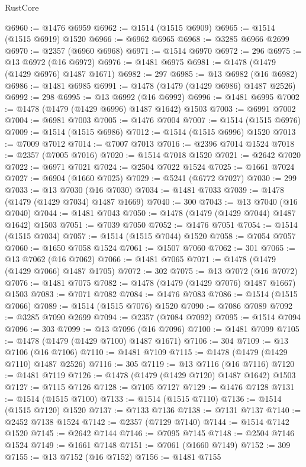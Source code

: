 \begin{lexlean}{RustCore}
\begin{coremodule}
@6960 := @1476 @6959
@6962 := @1514 (@1515 @6909)
@6965 := @1514 (@1515 @6919) @1520
@6966 := @6962 @6965
@6968 := @3285 @6966 @2699
@6970 := @2357 (@6960 @6968)
@6971 := @1514 @6970
@6972 := 296
@6975 := @13 @6972 (@16 @6972)
@6976 := @1481 @6975
@6981 := @1478 (@1479 (@1429 @6976) @1487 @1671)
@6982 := 297
@6985 := @13 @6982 (@16 @6982)
@6986 := @1481 @6985
@6991 := @1478 (@1479 (@1429 @6986) @1487 @2526)
@6992 := 298
@6995 := @13 @6992 (@16 @6992)
@6996 := @1481 @6995
@7002 := @1478 (@1479 (@1429 @6996) @1487 @1642) @1503
@7003 := @6991 @7002
@7004 := @6981 @7003
@7005 := @1476 @7004
@7007 := @1514 (@1515 @6976)
@7009 := @1514 (@1515 @6986)
@7012 := @1514 (@1515 @6996) @1520
@7013 := @7009 @7012
@7014 := @7007 @7013
@7016 := @2396 @7014 @1524
@7018 := @2357 (@7005 @7016)
@7020 := @1514 @7018 @1520
@7021 := @2642 @7020
@7022 := @6971 @7021
@7024 := @2504 @7022 @1524
@7025 := @1661 @7024
@7027 := @6904 (@1660 @7025)
@7029 := @5241 (@6772 @7027)
@7030 := 299
@7033 := @13 @7030 (@16 @7030)
@7034 := @1481 @7033
@7039 := @1478 (@1479 (@1429 @7034) @1487 @1669)
@7040 := 300
@7043 := @13 @7040 (@16 @7040)
@7044 := @1481 @7043
@7050 := @1478 (@1479 (@1429 @7044) @1487 @1642) @1503
@7051 := @7039 @7050
@7052 := @1476 @7051
@7054 := @1514 (@1515 @7034)
@7057 := @1514 (@1515 @7044) @1520
@7058 := @7054 @7057
@7060 := @1650 @7058 @1524
@7061 := @1507 @7060
@7062 := 301
@7065 := @13 @7062 (@16 @7062)
@7066 := @1481 @7065
@7071 := @1478 (@1479 (@1429 @7066) @1487 @1705)
@7072 := 302
@7075 := @13 @7072 (@16 @7072)
@7076 := @1481 @7075
@7082 := @1478 (@1479 (@1429 @7076) @1487 @1667) @1503
@7083 := @7071 @7082
@7084 := @1476 @7083
@7086 := @1514 (@1515 @7066)
@7089 := @1514 (@1515 @7076) @1520
@7090 := @7086 @7089
@7092 := @3285 @7090 @2699
@7094 := @2357 (@7084 @7092)
@7095 := @1514 @7094
@7096 := 303
@7099 := @13 @7096 (@16 @7096)
@7100 := @1481 @7099
@7105 := @1478 (@1479 (@1429 @7100) @1487 @1671)
@7106 := 304
@7109 := @13 @7106 (@16 @7106)
@7110 := @1481 @7109
@7115 := @1478 (@1479 (@1429 @7110) @1487 @2526)
@7116 := 305
@7119 := @13 @7116 (@16 @7116)
@7120 := @1481 @7119
@7126 := @1478 (@1479 (@1429 @7120) @1487 @1642) @1503
@7127 := @7115 @7126
@7128 := @7105 @7127
@7129 := @1476 @7128
@7131 := @1514 (@1515 @7100)
@7133 := @1514 (@1515 @7110)
@7136 := @1514 (@1515 @7120) @1520
@7137 := @7133 @7136
@7138 := @7131 @7137
@7140 := @2452 @7138 @1524
@7142 := @2357 (@7129 @7140)
@7144 := @1514 @7142 @1520
@7145 := @2642 @7144
@7146 := @7095 @7145
@7148 := @2504 @7146 @1524
@7149 := @1661 @7148
@7151 := @7061 (@1660 @7149)
@7152 := 309
@7155 := @13 @7152 (@16 @7152)
@7156 := @1481 @7155

\end{coremodule}
\end{lexlean}

